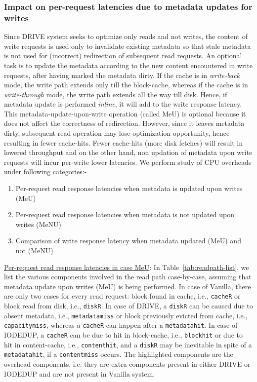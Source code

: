 \subsubsection{Impact on per-request latencies due to metadata updates for writes}
\label{sec:drivechap-reqlatency}
Since DRIVE system seeks to optimize only reads and not writes, the
content of write requests is used only to invalidate existing metadata
so that stale metadata is not used for (incorrect) redirection of
subsequent read requests.
An optional task is to update the metadata
according to
the new content encountered in write requests, after having marked the
metadata dirty.
If the cache is in \textit{write-back} mode, the write path
extends
only till the block-cache, whereas if the cache is in
\textit{write-through} mode,
the write path extends all the way till disk. Hence, if metadata
update is performed \textit{inline}, it will add to the write
response latency. This metadata-update-upon-write operation
(called MeU)
is optional because it does not affect the correctness of redirection.
However, since it leaves metadata dirty, subsequent read operation may
lose optimization opportunity, hence resulting in fewer cache-hits.
Fewer cache-hits (more disk fetches) will result in
lowered throughput and on the other hand, non updation of metadata
upon write requests will incur per-write lower latencies.
We perform
study of CPU overheads under following categories:-
\begin{enumerate}
		\singlespacing
 \item Per-request read response latencies when metadata is updated 
upon writes (MeU)
\item Per-request read response latencies when metadata is not updated
upon writes (MeNU)
\item Comparison of write response latency when metadata updated (MeU)
and not (MeNU)
\end{enumerate}

\vspace{-0.1in}
\underline{Per-request read response latencies in case MeU}:
In Table~\ref{tab:readpath-list}, we list the various components involved
in the read path case-by-case, assuming that metadata update upon
writes (MeU) is being performed. In case of Vanilla, there
are only two cases for every read request:
block found in cache, i.e., \texttt{cacheR} or
block read from disk, i.e., \texttt{diskR}.
In case of DRIVE, a \texttt{diskR} can be caused due
to absent metadata, i.e., \texttt{metadatamiss} or block previously
evicted from cache, i.e., \texttt{capacitymiss}, 
whereas a \texttt{cacheR} can happen after a \texttt{metadatahit}.
In case of IODEDUP, a \texttt{cacheR} can be
due to hit in block-cache, i.e., \texttt{blockhit} or
due to hit in content-cache, i.e., \texttt{contenthit},
and a \texttt{diskR} may be inevitable in spite of a \texttt{metadatahit}, if
a \texttt{contentmiss} occurs.
The highlighted components are the overhead components, i.e. they are extra
components present in either DRIVE or IODEDUP and are not present in Vanilla
system.



